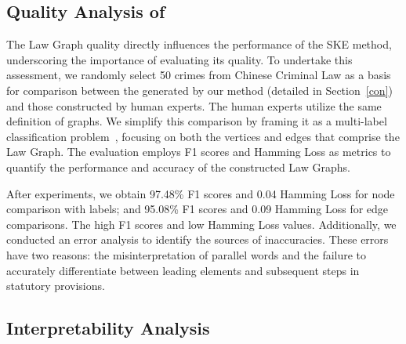 \subsection{Quality Analysis of } \label{qa}
\vspace{-0.5em}
The Law Graph quality directly influences the performance of the SKE method, underscoring the importance of evaluating its quality. To undertake this assessment, we randomly select 50 crimes from Chinese Criminal Law as a basis for comparison between the \lawgraph{} generated by our method (detailed in Section~\ref{con}) and those constructed by human experts. The human experts utilize the same definition of graphs. We simplify this comparison by framing it as a multi-label classification problem~\cite{6471714}, focusing on both the vertices and edges that comprise the Law Graph. The evaluation employs F1 scores and Hamming Loss as metrics to quantify the performance and accuracy of the constructed Law Graphs.

After experiments, we obtain 97.48\% F1 scores and 0.04 Hamming Loss for node comparison with labels; and 95.08\% F1 scores and 0.09 Hamming Loss for edge comparisons. The high F1 scores and low Hamming Loss values. Additionally, we conducted an error analysis to identify the sources of inaccuracies. These errors have two reasons: the misinterpretation of parallel words and the failure to accurately differentiate between leading elements and subsequent steps in statutory provisions.

\vspace{-1em}
\subsection{Interpretability Analysis}
\vspace{-0.5em}

